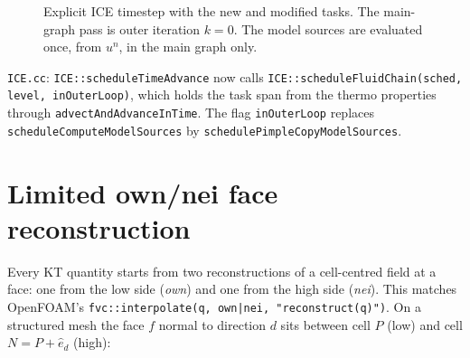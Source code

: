 \documentclass[11pt]{article}
\newcommand{\code}[1]{\texttt{\small #1}}
\newcommand{\file}[1]{\texttt{\small\color{Moss}#1}}
\begin{document}
\begin{figure}[ht]
\caption{Explicit ICE timestep with the new and modified tasks. The main-graph pass is outer
iteration $k=0$. The model sources are evaluated once, from $u^n$, in the main graph only.}
\label{fig:flow}
\end{figure}

\begin{incode}
\file{ICE.cc}: \code{ICE::scheduleTimeAdvance} now calls \code{ICE::scheduleFluidChain(sched,
level, inOuterLoop)}, which holds the task span from the thermo properties through
\code{advectAndAdvanceInTime}. The flag \code{inOuterLoop} replaces
\code{scheduleComputeModelSources} by \code{schedulePimpleCopyModelSources}.
\end{incode}

\section{Limited own/nei face reconstruction}\label{sec:recon}

Every KT quantity starts from two reconstructions of a cell-centred field at a face: one
from the low side (\emph{own}) and one from the high side (\emph{nei}). This matches OpenFOAM's
\code{fvc::interpolate(q, own|nei, "reconstruct(q)")}. On a structured mesh the face
$f$ normal to direction $d$ sits between cell $P$ (low) and cell $N=P+\hat e_d$ (high):
\end{document}
